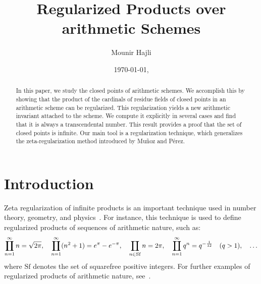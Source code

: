 \documentclass[12pt]{amsart}
\DeclareMathOperator*\Rprod{%
\mathchoice
  {\ooalign{$\displaystyle\prod$\cr\hidewidth$\displaystyle\coprod$\hidewidth\cr}}%
  {\ooalign{$\textstyle\prod$\cr\hidewidth$\textstyle\coprod$\hidewidth\cr}}%
  {\ooalign{$\scriptstyle\prod$\cr\hidewidth$\scriptstyle\coprod$\hidewidth\cr}}%
  {\ooalign{$\scriptscriptstyle\prod$\cr\hidewidth$%
  \scriptscriptstyle\coprod$\hidewidth\cr}}}
\begin{document}
\title{Regularized Products over arithmetic Schemes}

\author{Mounir Hajli}
\address{School of Science, Westlake University\\
Hangzhou, China 310000}

        
       


            \date{\today, \currenttime}



\begin{abstract}

In this paper, we study the closed points of arithmetic schemes. We accomplish this by showing that the product of the cardinals of residue fields of closed points in an arithmetic scheme can be regularized. This regularization yields a new arithmetic invariant attached to the scheme. We compute it explicitly in several cases and find that it is always a transcendental number. This result provides a proof that the set of closed points is infinite. Our main tool is a regularization technique, which generalizes the zeta-regularization method introduced by Mu\~noz and P\'erez.
\end{abstract}
\maketitle
\tableofcontents








\section{Introduction}
  





Zeta regularization of infinite products is an important technique used in number theory, geometry, and physics~\cite{Deninger-gamma, Deninger-L, RaySinger, Hawking1}. 
For instance, this technique is used to define regularized products of sequences of arithmetic nature, such as:
\[
\Rprod_{n=1}^\infty n = \sqrt{2\pi}, \quad
\Rprod_{n=1}^\infty (n^2+1) = e^{\pi} - e^{-\pi}, \quad
\Rprod_{n \in \mathrm{Sf}} n = 2\pi, \quad
\Rprod_{n=1}^\infty q^n = q^{-\frac{1}{12}} \quad (q > 1), \quad \ldots
\]
where $\mathrm{Sf}$ denotes the set of squarefree positive integers. 
For further examples of regularized products of  {arithmetic}  nature, see~\cite{Allouche-odious, Allouche-Cohen, Allouche-arith-sequences, Kurokawa1, Kurokawa-2005}.
\end{document}
